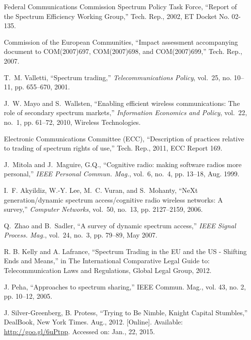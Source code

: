 \begin{thebibliography}{1}
{Federal Communications Commission Spectrum Policy Task Force}, ``Report of the
  {S}pectrum {E}fficiency {W}orking {G}roup,'' Tech. Rep., 2002, {ET} {D}ocket
  {N}o. 02-135.

{Commission of the European Communities}, ``Impact assessment accompanying
  document to {COM}(2007)697, {COM}(2007)698, and {COM}(2007)699,'' Tech. Rep.,
  2007.

T.~M. Valletti, ``Spectrum trading,'' \emph{Telecommunications Policy},
  vol.~25, no. 10–11, pp. 655--670, 2001.

J.~W. Mayo and S.~Wallsten, ``Enabling efficient wireless communications: The
  role of secondary spectrum markets,'' \emph{Information Economics and
  Policy}, vol.~22, no.~1, pp. 61--72, 2010, {W}ireless {T}echnologies.

{Electronic Communications Committee (ECC)}, ``Description of practices
  relative to trading of spectrum rights of use,'' Tech. Rep., 2011, {ECC}
  {R}eport 169.

J.~Mitola and J.~Maguire, G.Q., ``Cognitive radio: making software radios more
  personal,'' \emph{{IEEE} Personal Commun. Mag.}, vol.~6, no.~4, pp. 13--18,
  Aug. 1999.

I.~F. Akyildiz, W.-Y. Lee, M.~C. Vuran, and S.~Mohanty, ``{NeXt}
  generation/dynamic spectrum access/cognitive radio wireless networks: A
  survey,'' \emph{Computer Networks}, vol.~50, no.~13, pp. 2127--2159, 2006.

Q.~Zhao and B.~Sadler, ``A survey of dynamic spectrum access,'' \emph{{IEEE}
  Signal Process. Mag.}, vol.~24, no.~3, pp. 79--89, May 2007.

 R. B. Kelly and A. Lafrance, “Spectrum Trading in the EU and the US - Shifting Ends and Means,” in The International Comparative Legal Guide to: Telecommunication Laws and Regulations, Global Legal Group, 2012.

 J. Peha, “Approaches to spectrum sharing,” IEEE Commun. Mag., vol. 43, no. 2, pp. 10–12, 2005.

J. Silver-Greenberg, B. Protess, \enquote{Trying to Be Nimble, Knight Capital Stumbles,} DealBook, New York Times. Aug., 2012. [Online]. Available: \url{http://goo.gl/6uPtpp}. Accessed on: Jan., 22, 2015.


\end{thebibliography}

